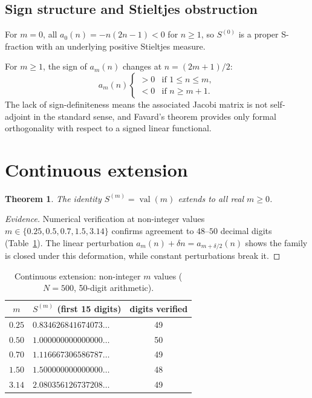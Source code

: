 \documentclass[11pt]{article}
\newcommand{\val}{\operatorname{val}}
\newtheorem{theorem}{Theorem}[section]
\theoremstyle{definition}
\theoremstyle{remark}
\begin{document}
\subsection{Sign structure and Stieltjes obstruction}

For $m = 0$, all $a_0(n) = -n(2n{-}1) < 0$ for $n \geq 1$,
so $S^{(0)}$ is a proper S-fraction with an underlying
positive Stieltjes measure.

For $m \geq 1$, the sign of $a_m(n)$ changes at
$n = (2m{+}1)/2$:
\[
  a_m(n) \begin{cases}
    > 0 & \text{if } 1 \leq n \leq m, \\
    < 0 & \text{if } n \geq m{+}1.
  \end{cases}
\]
The lack of sign-definiteness means the associated Jacobi matrix
is not self-adjoint in the standard sense, and Favard's theorem
provides only formal orthogonality with respect to a signed
linear functional.


\section{Continuous extension}\label{sec:continuous}

\begin{theorem}\label{thm:continuous}
The identity $S^{(m)} = \val(m)$ extends to all real $m \geq 0$.
\end{theorem}

\begin{proof}[Evidence]
Numerical verification at non-integer values
$m \in \{0.25, 0.5, 0.7, 1.5, 3.14\}$
confirms agreement to $48$--$50$ decimal digits
(Table~\ref{tab:continuous}).
The linear perturbation
$a_m(n) + \delta n = a_{m+\delta/2}(n)$
shows the family is closed under this deformation,
while constant perturbations break it.
\end{proof}

\begin{table}[h]
\centering
\caption{Continuous extension: non-integer $m$ values
($N=500$, 50-digit arithmetic).}
\label{tab:continuous}
\begin{tabular}{@{}clc@{}}
\toprule
$m$ & $S^{(m)}$ (first 15 digits) & digits verified \\
\midrule
$0.25$ & $0.834626841674073\ldots$ & 49 \\
$0.50$ & $1.000000000000000\ldots$ & 50 \\
$0.70$ & $1.116667306586787\ldots$ & 49 \\
$1.50$ & $1.500000000000000\ldots$ & 48 \\
$3.14$ & $2.080356126737208\ldots$ & 49 \\
\bottomrule
\end{tabular}
\end{table}
\end{document}
